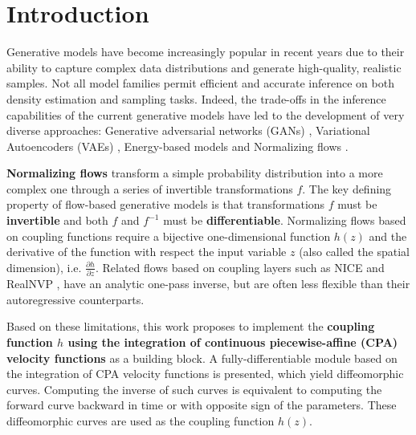 

\section{Introduction}\label{sec:introduction_6}


Generative models have become increasingly popular in recent years due to their ability to capture complex data distributions and generate high-quality, realistic samples.
Not all model families permit efficient and accurate inference on both density estimation and sampling tasks. Indeed, the trade-offs in the inference capabilities of the current generative models have led to the development of very diverse approaches: Generative adversarial networks (GANs) \cite{goodfellow2020generative}, Variational Autoencoders (VAEs) \cite{kingma2013auto}, Energy-based models \cite{lecun2005loss} and Normalizing flows \cite{rezende2015variational}. 


\textbf{Normalizing flows} transform a simple probability distribution into a more complex one through a series of invertible transformations $f$.
The key defining property of flow-based generative models is that transformations $f$ must be \textbf{invertible} and both $f$ and $f^{-1}$ must be \textbf{differentiable}.
Normalizing flows based on coupling functions require a bijective one-dimensional function $h(z)$ and the derivative of the function with respect the input variable $z$ (also called the spatial dimension), i.e. $\frac{\partial h}{\partial z}$.
Related flows based on coupling layers such as NICE \cite{dinh2014nice} and RealNVP \cite{dinh2016density}, have an analytic one-pass inverse, but are often less flexible than their autoregressive counterparts. 

Based on these limitations, this work proposes to implement the \textbf{coupling function $h$ using the integration of continuous piecewise-affine (CPA) velocity functions} as a building block. A fully-differentiable module based on the integration of CPA velocity functions is presented, which yield diffeomorphic curves. Computing the inverse of such curves is equivalent to computing the forward curve backward in time or with opposite sign of the parameters. These diffeomorphic curves are used as the coupling function $h(z)$. 

